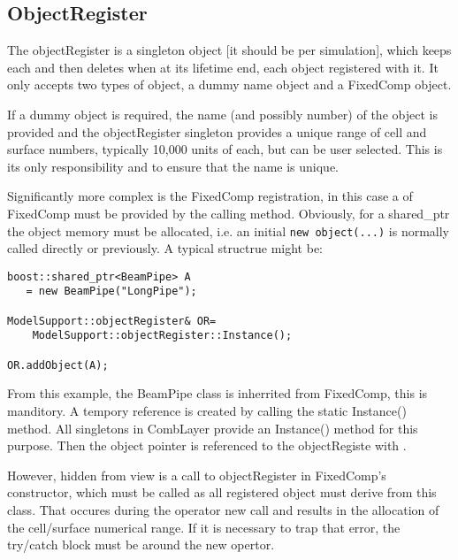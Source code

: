 \subsection{ObjectRegister}
\label{ObjectRegister}

The objectRegister is a singleton object [it should be per
  simulation], which keeps each and then deletes when at its lifetime
end, each object registered with it. It only accepts two types of
object, a dummy name object and a FixedComp object. 

If a dummy object is required, the name (and possibly number) of the object 
is provided and the objectRegister singleton provides a unique
range of cell and surface numbers, typically 10,000 units of each, but
can be user selected. This is its only responsibility and to ensure that the
name is unique. 

Significantly more complex is the FixedComp registration, in this case
a  of FixedComp must be provided by the
calling method. Obviously, for a shared\_ptr the object memory must be
allocated, i.e. an initial \verb|new object(...)| is normally called
directly or previously. A typical structrue might be:

\begin{verbatim}
boost::shared_ptr<BeamPipe> A 
   = new BeamPipe("LongPipe");

ModelSupport::objectRegister& OR=
    ModelSupport::objectRegister::Instance();

OR.addObject(A);
\end{verbatim}

From this example, the BeamPipe class is inherrited from FixedComp,
this is manditory. A tempory reference  is created by calling
the static Instance() method. All singletons in CombLayer provide an
Instance() method for this purpose. Then the object pointer is referenced
to the objectRegiste with .

However, hidden from view is a call to objectRegister in FixedComp's
constructor, which must be called as all registered object must derive
from this class. That occures during the operator new call and results
in the allocation of the cell/surface numerical range. If it is
necessary to trap that error, the try/catch block must be around the
new opertor.


